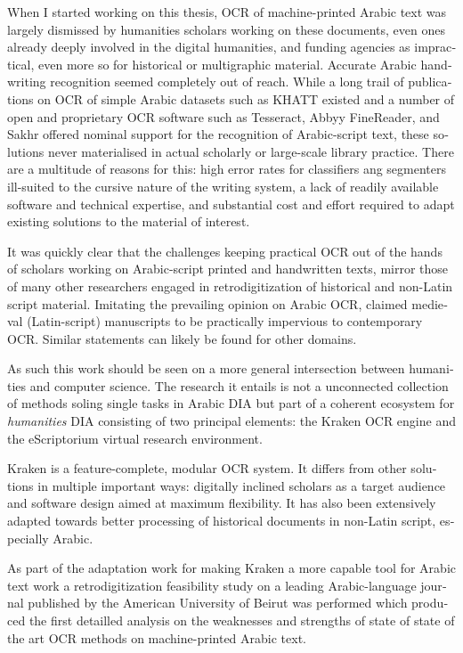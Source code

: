 \begin{french}
When I started working on this thesis, OCR of machine-printed Arabic text was
largely dismissed by humanities scholars working on these documents, even ones
already deeply involved in the digital humanities, and funding agencies as
impractical, even more so for historical or multigraphic material. Accurate
Arabic handwriting recognition seemed completely out of reach. While a long
trail of publications on OCR of simple Arabic datasets such as KHATT
\cite{mahmoud2014khatt} existed and a number of open and proprietary OCR
software such as Tesseract, Abbyy FineReader, and Sakhr offered nominal support
for the recognition of Arabic-script text, these solutions never materialised
in actual scholarly or large-scale library practice. There are a multitude of
reasons for this: high error rates for classifiers ang segmenters ill-suited to
the cursive nature of the writing system, a lack of readily available software
and technical expertise, and substantial cost and effort required to adapt
existing solutions to the material of interest.

It was quickly clear that the challenges keeping practical OCR out of the hands
of scholars working on Arabic-script printed and handwritten texts, mirror
those of many other researchers engaged in retrodigitization of historical and
non-Latin script material. Imitating the prevailing opinion on Arabic OCR,
\cite{widner2017toward} claimed medieval (Latin-script) manuscripts to be
practically impervious to contemporary OCR. Similar statements can likely be
found for other domains.

As such this work should be seen on a more general intersection between
humanities and computer science. The research it entails is not a unconnected
collection of methods soling single tasks in Arabic DIA but part of a coherent
ecosystem for \emph{humanities} DIA consisting of two principal elements: the
Kraken OCR engine and the eScriptorium virtual research environment. 

Kraken is a feature-complete, modular OCR system. It differs from other
solutions in multiple important ways: digitally inclined scholars as a target
audience and software design aimed at maximum flexibility. It has also been
extensively adapted towards better processing of historical documents in
non-Latin script, especially Arabic.

As part of the adaptation work for making Kraken a more capable tool for Arabic
text work a retrodigitization feasibility study on a leading Arabic-language
journal published by the American University of Beirut was performed which
produced the first detailled analysis on the weaknesses and strengths of state
of state of the art OCR methods on machine-printed Arabic text.


\end{french}

